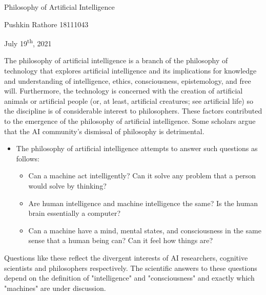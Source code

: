 \documentclass[12pt]{article}
\begin{document}
\begin{center}
{\Large Philosophy of Artificial Intelligence}
\end{center}


\begin{center}
Pushkin Rathore 18111043 
\end{center}


\begin{center}
July 19\textsuperscript{th}, 2021
\end{center}


\vspace{0\baselineskip}
The philosophy of artificial intelligence is a branch of the philosophy of technology that explores artificial intelligence and its implications for knowledge and understanding of intelligence, ethics, consciousness, epistemology, and free will. Furthermore, the technology is concerned with the creation of artificial animals or artificial people (or, at least, artificial creatures; see artificial life) so the discipline is of considerable interest to philosophers. These factors contributed to the emergence of the philosophy of artificial intelligence. Some scholars argue that the AI community's dismissal of philosophy is detrimental.

\begin{itemize}
	\item The philosophy of artificial intelligence attempts to answer such questions as follows:

\vspace{1\baselineskip}
\begin{itemize}
	\item Can a machine act intelligently? Can it solve any problem that a person would solve by thinking?

	\item Are human intelligence and machine intelligence the same? Is the human brain essentially a computer?

	\item Can a machine have a mind, mental states, and consciousness in the same sense that a human being can? Can it feel how things are?

\end{itemize}
\end{itemize}
Questions like these reflect the divergent interests of AI researchers, cognitive scientists and philosophers respectively. The scientific answers to these questions depend on the definition of "intelligence" and "consciousness" and exactly which "machines" are under discussion.
\end{document}
